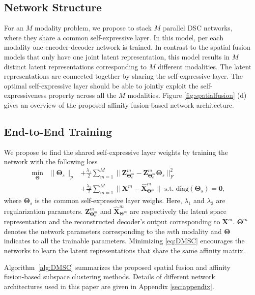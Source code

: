 \documentclass[journal]{IEEEtran}
\begin{document}
\subsection{Network Structure}
For an $M$ modality problem, we propose to stack $M$ parallel DSC networks, where they share a common self-expressive layer.		 In this model, per each modality one encoder-decoder network is trained.		In contrast to the spatial fusion models that only have one joint latent representation,  this model results in $M$ distinct latent representations corresponding to $M$ different modalities.		 The latent representations are connected together by sharing the self-expressive layer.		 The optimal self-expressive layer should be able to jointly exploit the self-expressiveness property across all the $M$ modalities.		   Figure \ref{fig:spatialfusion} (d) gives an overview of the proposed affinity fusion-based network architecture.

\subsection{End-to-End Training}
 We propose to find the shared self-expressive layer weights by training the network with the following loss 
\begin{align}\label{eq:DMSC}
\nonumber \min_{\boldsymbol{\Theta}}\;\;  \|\boldsymbol{\Theta}_{s}\|_{p}&+\frac{\lambda_1}{2}\sum_{m=1}^{M}\|\mathbf{Z}^{m}_{\boldsymbol{\Theta}^m_e}- \mathbf{Z}^m_{\boldsymbol{\Theta}^m_e}\boldsymbol{\Theta}_{s}\|_{F}^{2}\\
&+  \frac{\lambda_2}{2}\sum_{m=1}^{M} \| \mathbf{X}^m - \hat{ \mathbf{X}}^{m}_{\boldsymbol{\Theta}^m}\|
\text{  s.t. } \text{diag}(\boldsymbol{\Theta}_s)=\mathbf{0}, 
\end{align}
where $\boldsymbol{\Theta}_{s}$ is the common self-expressive layer weighs.	Here, $\lambda_{1}$ and $\lambda_{2}$ are regularization parameters.  $\mathbf{Z}^{m}_{\boldsymbol{\Theta}^m_e}$ and $\hat{\mathbf{X}}^m_{\boldsymbol{\Theta}^m}$  are respectively the latent space representation and the reconstructed decoder's output corresponding to $\mathbf{X}^m$.		    $\boldsymbol{\Theta}^m$ denotes the network parameters corresponding to the $m$th modality and $\boldsymbol{\Theta}$ indicates to all the trainable parameters.  Minimizing \eqref{eq:DMSC} encourages the networks to learn the latent representations that share the same affinity matrix.	

Algorithm~\ref{alg:DMSC} summarizes the proposed spatial fusion and affinity fusion-based subspace clustering methods.	Details of different network architectures used in this paper are given in Appendix \ref{sec:appendix}. 
\end{document}

